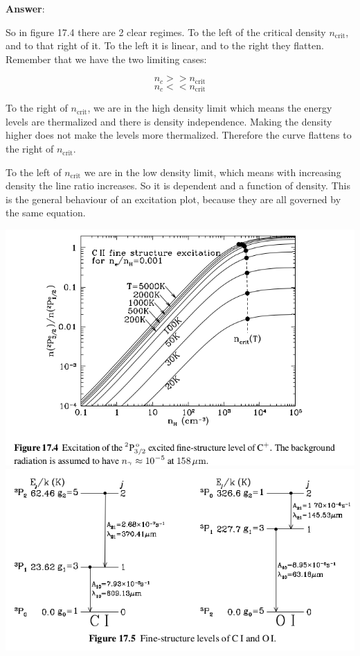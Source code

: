 \documentclass[11pt]{article}
\makeatletter
\def\maxwidth{\ifdim\Gin@nat@width>\linewidth\linewidth
    \else\Gin@nat@width\fi}
\let\Oldincludegraphics\includegraphics
\renewcommand{\includegraphics}[1]{\Oldincludegraphics[width=.8\maxwidth]{#1}}
\makeatother
\begin{document}
\textbf{Answer}:

So in figure 17.4 there are 2 clear regimes. To the left of the critical
density \(n_\text{crit}\), and to that right of it. To the left it is
linear, and to the right they flatten. Remember that we have the two
limiting cases:

\[ n_c >> n_\text{crit} \] \[ n_c << n_\text{crit} \]

To the right of \(n_\text{crit}\), we are in the high density limit
which means the energy levels are thermalized and there is density
independence. Making the density higher does not make the levels more
thermalized. Therefore the curve flattens to the right of
\(n_\text{crit}\).

To the left of \(n_\text{crit}\) we are in the low density limit, which
means with increasing density the line ratio increases. So it is
dependent and a function of density. This is the general behaviour of an
excitation plot, because they are all governed by the same equation.

    \includegraphics{figs/fig_2.png} \includegraphics{figs/fig_3.png}
\end{document}
